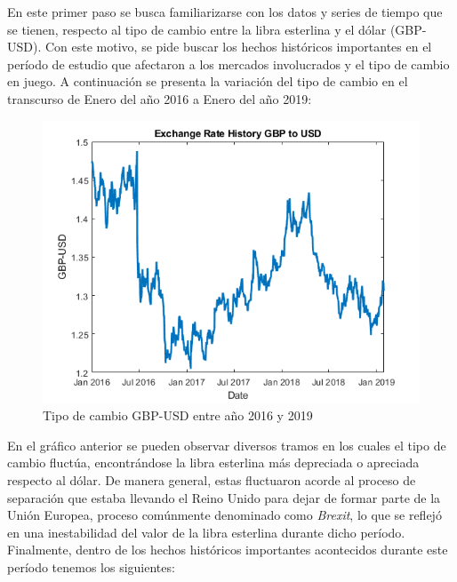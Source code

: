 En este primer paso se busca familiarizarse con los datos y series de tiempo que se tienen, respecto al tipo de cambio entre la libra esterlina y el dólar (GBP-USD). Con este motivo, se pide buscar los hechos históricos importantes en el período de estudio que afectaron a los mercados involucrados y el tipo de cambio en juego. A continuación se presenta la variación del tipo de cambio en el transcurso de Enero del año 2016 a Enero del año 2019:

\begin{figure}[H]
    \begin{center}
    \includegraphics[width = 13cm]{figures/data.png}
    \caption{Tipo de cambio GBP-USD entre año 2016 y 2019}
    \label{fig:my_label1} %
    \end{center}
\end{figure}
\newpage

\noindent En el gráfico anterior se pueden observar diversos tramos en los cuales el tipo de cambio fluctúa, encontrándose la libra esterlina más depreciada o apreciada respecto al dólar. De manera general, estas fluctuaron acorde al proceso de separación que estaba llevando el Reino Unido para dejar de formar parte de la Unión Europea, proceso comúnmente denominado como \textit{Brexit}, lo que se reflejó en una inestabilidad del valor de la libra esterlina durante dicho período. Finalmente, dentro de los hechos históricos importantes acontecidos durante este período tenemos los siguientes:

